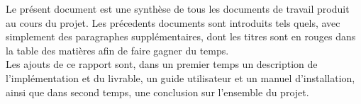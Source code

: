Le présent document est une synthèse de tous les documents de travail produit au cours du projet. Les précedents documents sont introduits tels quels, avec simplement des paragraphes supplémentaires, dont les titres sont en rouges dans la table des matières afin de faire gagner du temps.\\
Les ajouts de ce rapport sont, dans un premier temps un description de l'implémentation et du livrable, un guide utilisateur et un manuel d'installation, ainsi que dans second temps, une conclusion sur l'ensemble du projet.
